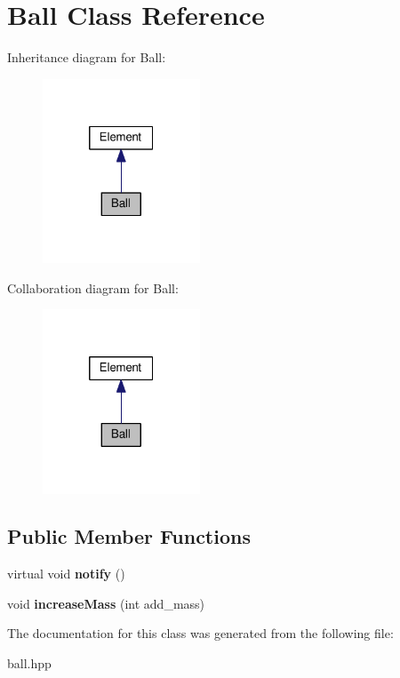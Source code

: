 \hypertarget{classBall}{}\section{Ball Class Reference}
\label{classBall}


Inheritance diagram for Ball\+:
\nopagebreak
\begin{figure}[H]
\begin{center}
\leavevmode
\includegraphics[width=133pt]{classBall__inherit__graph}
\end{center}
\end{figure}


Collaboration diagram for Ball\+:
\nopagebreak
\begin{figure}[H]
\begin{center}
\leavevmode
\includegraphics[width=133pt]{classBall__coll__graph}
\end{center}
\end{figure}
\subsection*{Public Member Functions}
\begin{DoxyCompactItemize}
\item 
virtual void {\bfseries notify} ()\hypertarget{classBall_aac709d26ebeb71a87af845dc8c2316a2}{}\label{classBall_aac709d26ebeb71a87af845dc8c2316a2}

\item 
void {\bfseries increase\+Mass} (int add\+\_\+mass)\hypertarget{classBall_a39e9307ae41f0b651315c5d0dbb30b73}{}\label{classBall_a39e9307ae41f0b651315c5d0dbb30b73}

\end{DoxyCompactItemize}


The documentation for this class was generated from the following file\+:\begin{DoxyCompactItemize}
\item 
ball.\+hpp\end{DoxyCompactItemize}
